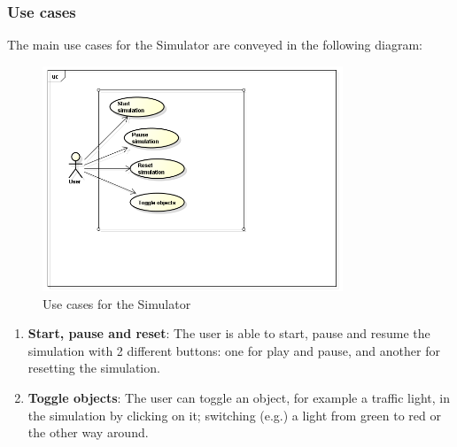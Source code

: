 \subsubsection{Use cases}
The main use cases for the Simulator are conveyed in the following diagram: 

\begin{figure}[htp]
\begin{center}
  \includegraphics[width=0.8\textwidth]{image/SimulatorUC.png}
  \caption{Use cases for the Simulator}
  \label{fig:simulator_usecases}
\end{center}
\end{figure}

\begin{enumerate}
	\item \textbf{Start, pause and reset}: The user is able to start, pause and resume the simulation with 2 different buttons: one for play and pause, and another for resetting the simulation.
	
	\item \textbf{Toggle objects}: The user can toggle an object, for example a traffic light, in the simulation by clicking on it; switching (e.g.) a light from green to red or the other way around. 
\end{enumerate}




